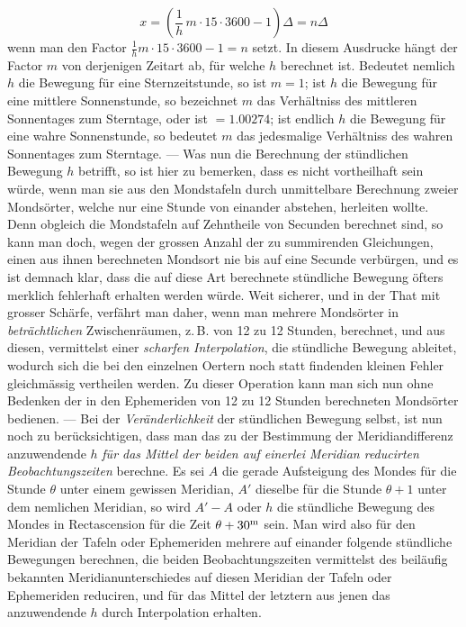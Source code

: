 \[
x = \left(\frac{1}{h}\,m\cdot 15\cdot 3600 - 1\right)\Delta = n\Delta
\]
\noindent wenn man den Factor $\frac{1}{h}m\cdot15\cdot3600-1=n$ setzt. In diesem Ausdrucke hängt der
Factor $m$ von derjenigen Zeitart ab, für welche $h$ berechnet ist. Bedeutet nemlich $h$ die
Bewegung für eine Sternzeitstunde, so ist $m=1$; ist $h$ die Bewegung für eine mittlere
Sonnenstunde, so bezeichnet $m$ das Verhältniss des mittleren Sonnentages zum Sterntage, oder
ist $=1.00274$; ist endlich $h$ die Bewegung für eine wahre Sonnenstunde, so bedeutet $m$ das
jedesmalige Verhältniss des wahren Sonnentages zum Sterntage. --- Was nun die Berechnung der
stündlichen Bewegung $h$ betrifft, so ist hier zu bemerken, dass es nicht vortheilhaft sein
würde, wenn man sie aus den Mondstafeln durch unmittelbare Berechnung zweier Mondsörter,
welche nur eine Stunde von einander abstehen, herleiten wollte. Denn obgleich die Mondstafeln
auf Zehntheile von Secunden berechnet sind, so kann man doch, wegen der grossen Anzahl der zu
summirenden Gleichungen, einen aus ihnen berechneten Mondsort nie bis auf eine Secunde
verbürgen, und es ist demnach klar, dass die auf diese Art berechnete stündliche Bewegung
öfters merklich fehlerhaft erhalten werden würde. Weit sicherer, und in der That mit grosser
Schärfe, verfährt man daher, wenn man mehrere Mondsörter in \emph{beträchtlichen}
Zwischenräumen, z.\,B. von 12 zu 12 Stunden, berechnet, und aus diesen, vermittelst einer
\emph{scharfen Interpolation}, die stündliche Bewegung ableitet, wodurch sich die bei den
einzelnen Oertern noch statt findenden kleinen Fehler gleichmässig vertheilen werden. Zu
dieser Operation kann man sich nun ohne Bedenken der in den Ephemeriden von 12 zu 12 Stunden
berechneten Mondsörter bedienen. --- Bei der \emph{Veränderlichkeit} der stündlichen Bewegung
selbst, ist nun noch zu berücksichtigen, dass man das zu der Bestimmung der Meridiandifferenz
anzuwendende $h$ \emph{für das Mittel der beiden auf einerlei Meridian reducirten
Beobachtungszeiten} berechne. Es sei $A$ die gerade Aufsteigung des Mondes für die Stunde
$\theta$ unter einem gewissen Meridian, $A'$ dieselbe für die Stunde $\theta+1$ unter dem
nemlichen Meridian, so wird $A'-A$ oder $h$ die stündliche Bewegung des Mondes in
Rectascension für die Zeit $\theta+30^{\rm m}$ sein. Man wird also für den Meridian der Tafeln
oder Ephemeriden mehrere auf einander folgende stündliche Bewegungen berechnen, die beiden
Beobachtungszeiten vermittelst des beiläufig bekannten Meridianunterschiedes auf diesen
Meridian der Tafeln oder Ephemeriden reduciren, und für das Mittel der letztern aus jenen das
anzuwendende $h$ durch Interpolation erhalten.

